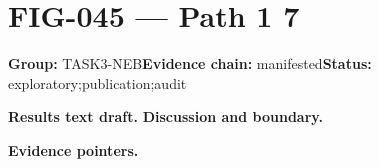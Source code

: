 \clearpage
\section{FIG-045 --- Path 1 7}
\label{figpage:fig-045}
\textbf{Group:} TASK3-NEB\quad \textbf{Evidence chain:} manifested\quad \textbf{Status:} exploratory;publication;audit

\textbf{Results text draft.} 
\textbf{Discussion and boundary.} 


\textbf{Evidence pointers.}



\vfill

